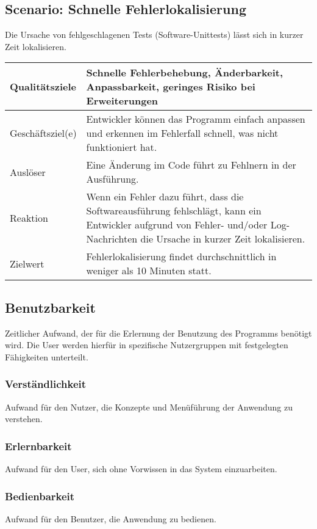 \documentclass[
	ngerman,
	toc=listof, %
	toc=bibliography, %
	footnotes=multiple, %
	parskip=half, %
	numbers=noendperiod %
]{scrartcl}
\begin{document}
		\subsection{Scenario: Schnelle Fehlerlokalisierung}
			Die Ursache von fehlgeschlagenen Tests (Software-Unittests) lässt sich in kurzer Zeit lokalisieren.

			\begin{tabularx}{\textwidth}{lX}
				\toprule
				Qualitätsziele & Schnelle Fehlerbehebung, Änderbarkeit, Anpassbarkeit, geringes Risiko bei Erweiterungen  \\
				\midrule
				Geschäftsziel(e) & Entwickler können das Programm einfach anpassen und erkennen im Fehlerfall schnell, was nicht funktioniert hat.  \\
				\midrule
				Auslöser & Eine Änderung im Code führt zu Fehlnern in der Ausführung.  \\
				\midrule
				Reaktion & Wenn ein Fehler dazu führt, dass die Softwareausführung fehlschlägt, kann ein Entwickler aufgrund von Fehler- und/oder Log-Nachrichten die Ursache in kurzer Zeit lokalisieren.  \\
				\midrule
				Zielwert & Fehlerlokalisierung findet durchschnittlich in weniger als 10 Minuten statt.  \\
				\bottomrule
			\end{tabularx}
			\newpage

	\subsection{Benutzbarkeit}
		Zeitlicher Aufwand, der für die Erlernung der Benutzung des Programms benötigt wird. 
		Die User werden hierfür in spezifische Nutzergruppen mit festgelegten Fähigkeiten unterteilt.
		
		\subsubsection{Verständlichkeit}
			Aufwand für den Nutzer, die Konzepte und Menüführung der Anwendung zu verstehen.

		\subsubsection{Erlernbarkeit}
			Aufwand für den User, sich ohne Vorwissen in das System einzuarbeiten.

		\subsubsection{Bedienbarkeit}
			Aufwand für den Benutzer, die Anwendung zu bedienen.
\end{document}
